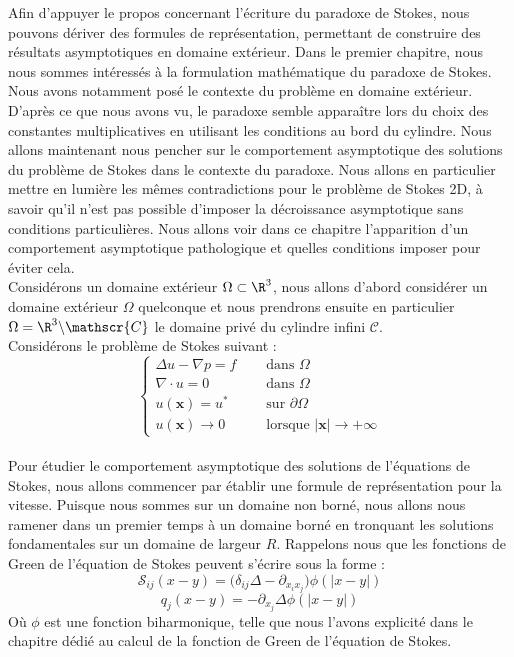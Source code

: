 Afin d'appuyer le propos concernant l'écriture du paradoxe de Stokes, nous pouvons dériver des formules de représentation, permettant de construire des résultats asymptotiques en domaine extérieur.
Dans le premier chapitre, nous nous sommes intéressés à la formulation mathématique du paradoxe de Stokes. Nous avons notamment posé le contexte du problème en domaine extérieur. D'après ce que nous avons vu, le paradoxe semble apparaître lors du choix des constantes multiplicatives en utilisant les conditions au bord du cylindre. Nous allons maintenant nous pencher sur le comportement asymptotique des solutions du problème de Stokes dans le contexte du paradoxe.
Nous allons en particulier mettre en lumière les mêmes contradictions pour le problème de Stokes 2D, à savoir qu'il n'est pas possible d'imposer la décroissance asymptotique sans conditions particulières. Nous allons voir dans ce chapitre l'apparition d'un comportement asymptotique pathologique et quelles conditions imposer pour éviter cela.\\
Considérons un domaine extérieur $\Omega \subset \R^3$, nous allons d'abord considérer un domaine extérieur $\Omega$ quelconque et nous prendrons ensuite en particulier $\Omega = \R^3 \backslash \mathscr{C}$ le domaine privé du cylindre infini $\mathscr{C}$.  \\
Considérons le problème de Stokes suivant :
$$\begin{cases}
    \Delta u - \nabla p = f \quad &\text{ dans } \Omega \\
    \nabla \cdot u = 0 &\text{ dans } \Omega \\
    u(\mathbf{x}) = u^* &\text{ sur } \partial \Omega \\
    u(\mathbf{x}) \longrightarrow 0 &\text{ lorsque } \mathbf{|x|} \to +\infty
\end{cases}$$
\\
Pour étudier le comportement asymptotique des solutions de l'équations de Stokes, nous allons commencer par établir une formule de représentation pour la vitesse. 
Puisque nous sommes sur un domaine non borné, nous allons nous ramener dans un premier temps à un domaine borné en tronquant les solutions fondamentales sur un domaine de largeur $R$.
Rappelons nous que les fonctions de Green de l'équation de Stokes peuvent s'écrire sous la forme :
$$\mathscr{S}_{ij}(x-y) = \Big(\delta_{ij}\Delta - \partial_{x_i x_j} \Big)\phi(|x-y|) $$
$$ q_j(x-y) = - \partial_{x_j}\Delta \phi(|x-y|) $$
Où $\phi$ est une fonction biharmonique, telle que nous l'avons explicité dans le chapitre dédié au calcul de la fonction de Green de l'équation de Stokes.\\

